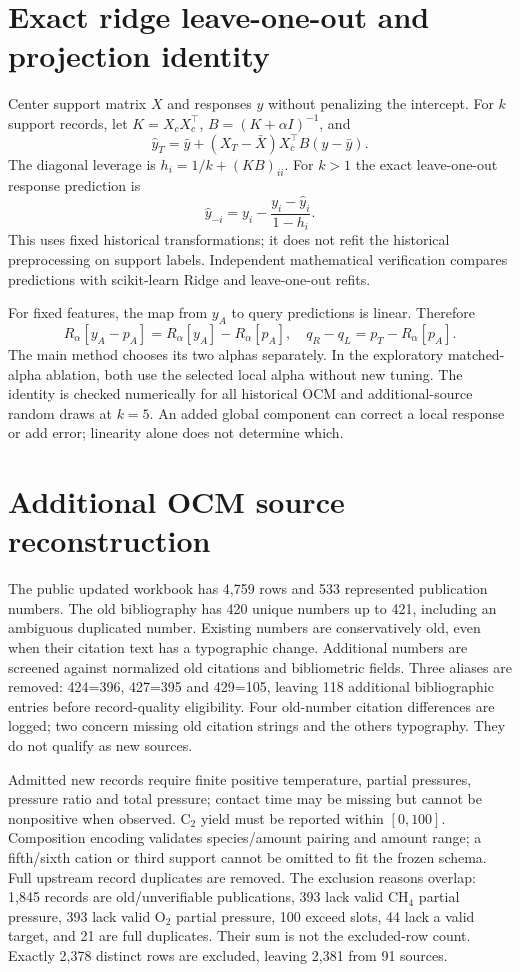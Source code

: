 \documentclass[11pt]{article}
\begin{document}
\section{Exact ridge leave-one-out and projection identity}
Center support matrix $X$ and responses $y$ without penalizing the intercept. For $k$ support records, let $K=X_cX_c^\top$, $B=(K+\alpha I)^{-1}$, and
\[\widehat y_T=\bar y+(X_T-\bar X)X_c^\top B(y-\bar y).\]
The diagonal leverage is $h_i=1/k+(KB)_{ii}$. For $k>1$ the exact leave-one-out response prediction is
\[\widehat y_{-i}=y_i-\frac{y_i-\widehat y_i}{1-h_i}.\]
This uses fixed historical transformations; it does not refit the historical preprocessing on support labels. Independent mathematical verification compares predictions with scikit-learn Ridge and leave-one-out refits.

For fixed features, the map from $y_A$ to query predictions is linear. Therefore
\[R_\alpha[y_A-p_A]=R_\alpha[y_A]-R_\alpha[p_A],\quad q_R-q_L=p_T-R_\alpha[p_A].\]
The main method chooses its two alphas separately. In the exploratory matched-alpha ablation, both use the selected local alpha without new tuning. The identity is checked numerically for all historical OCM and additional-source random draws at $k=5$. An added global component can correct a local response or add error; linearity alone does not determine which.

\section{Additional OCM source reconstruction}
The public updated workbook has 4,759 rows and 533 represented publication numbers. The old bibliography has 420 unique numbers up to 421, including an ambiguous duplicated number. Existing numbers are conservatively old, even when their citation text has a typographic change. Additional numbers are screened against normalized old citations and bibliometric fields. Three aliases are removed: 424=396, 427=395 and 429=105, leaving 118 additional bibliographic entries before record-quality eligibility. Four old-number citation differences are logged; two concern missing old citation strings and the others typography. They do not qualify as new sources.

Admitted new records require finite positive temperature, partial pressures, pressure ratio and total pressure; contact time may be missing but cannot be nonpositive when observed. C$_2$ yield must be reported within $[0,100]$. Composition encoding validates species/amount pairing and amount range; a fifth/sixth cation or third support cannot be omitted to fit the frozen schema. Full upstream record duplicates are removed. The exclusion reasons overlap: 1,845 records are old/unverifiable publications, 393 lack valid CH$_4$ partial pressure, 393 lack valid O$_2$ partial pressure, 100 exceed slots, 44 lack a valid target, and 21 are full duplicates. Their sum is not the excluded-row count. Exactly 2,378 distinct rows are excluded, leaving 2,381 from 91 sources.
\end{document}
